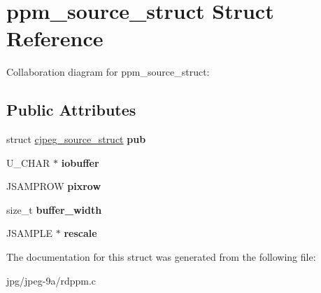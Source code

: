 \hypertarget{structppm__source__struct}{\section{ppm\+\_\+source\+\_\+struct Struct Reference}
\label{structppm__source__struct}
}


Collaboration diagram for ppm\+\_\+source\+\_\+struct\+:
\subsection*{Public Attributes}
\begin{DoxyCompactItemize}
\item 
\hypertarget{structppm__source__struct_aafdb75aaefd2330c38b653bf17a42a23}{struct \hyperlink{structcjpeg__source__struct}{cjpeg\+\_\+source\+\_\+struct} {\bfseries pub}}\label{structppm__source__struct_aafdb75aaefd2330c38b653bf17a42a23}

\item 
\hypertarget{structppm__source__struct_ad4d3a4885c4594a767a96f3a2fe9a57c}{U\+\_\+\+C\+H\+A\+R $\ast$ {\bfseries iobuffer}}\label{structppm__source__struct_ad4d3a4885c4594a767a96f3a2fe9a57c}

\item 
\hypertarget{structppm__source__struct_a206562cbb89c9d7dbda538d1d4dff66c}{J\+S\+A\+M\+P\+R\+O\+W {\bfseries pixrow}}\label{structppm__source__struct_a206562cbb89c9d7dbda538d1d4dff66c}

\item 
\hypertarget{structppm__source__struct_ae11976911d2a6c1121533349e2217bb5}{size\+\_\+t {\bfseries buffer\+\_\+width}}\label{structppm__source__struct_ae11976911d2a6c1121533349e2217bb5}

\item 
\hypertarget{structppm__source__struct_a875014e03e2475d5ace6e88c8374302c}{J\+S\+A\+M\+P\+L\+E $\ast$ {\bfseries rescale}}\label{structppm__source__struct_a875014e03e2475d5ace6e88c8374302c}

\end{DoxyCompactItemize}


The documentation for this struct was generated from the following file\+:\begin{DoxyCompactItemize}
\item 
jpg/jpeg-\/9a/rdppm.\+c\end{DoxyCompactItemize}
